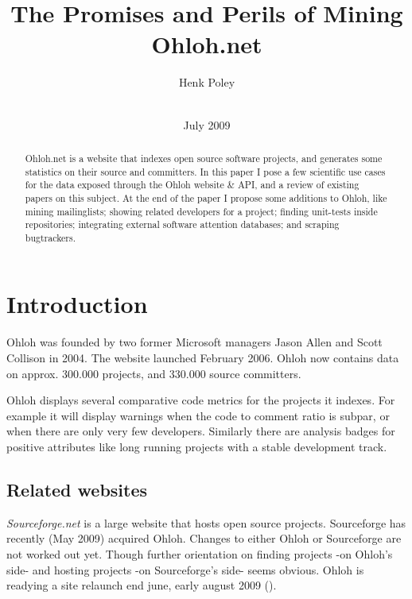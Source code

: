 \documentclass{sig-alternate}
\begin{document}
\toappear{} %

\title{The Promises and Perils of Mining Ohloh.net}

\author{
\alignauthor Henk Poley\\
  \\
}

\date{July 2009}


\maketitle

\begin{abstract}
Ohloh.net is a website that indexes open source software projects, and generates some statistics on their source and committers. In this paper I pose a few scientific use cases for the data exposed through the Ohloh website \& API, and a review of existing papers on this subject. At the end of the paper I propose some additions to Ohloh, like mining mailinglists; showing related developers for a project; finding unit-tests inside repositories; integrating external software attention databases; and scraping bugtrackers.
\end{abstract}


\section{Introduction}
Ohloh was founded by two former Microsoft managers Jason Allen and Scott Collison in 2004. The website launched February 2006. Ohloh now contains data on approx. 300.000 projects, and 330.000 source committers.

Ohloh displays several comparative code metrics for the projects it indexes. For example it will display warnings when the code to comment ratio is subpar, or when there are only very few developers. Similarly there are analysis badges for positive attributes like long running projects with a stable development track.


\subsection{Related websites}
\emph{Sourceforge.net} is a large website that hosts open source projects. Sourceforge has recently (May 2009) acquired Oh\-loh. Changes to either Ohloh or Sourceforge are not worked out yet. Though further orientation on finding projects -on Ohloh's side- and hosting projects -on Sourceforge's side- seems obvious. Ohloh is readying a site relaunch end june, early august 2009 (\cite{behind-the-scenes}).
\end{document}
